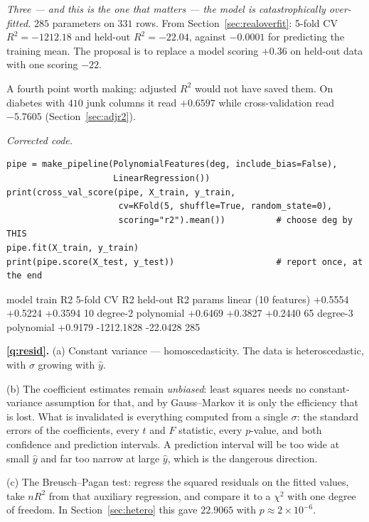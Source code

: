 \documentclass[11pt]{article}
\begin{document}
\emph{Three --- and this is the one that matters --- the model is
catastrophically over-fitted.} $285$ parameters on $331$ rows. From
Section~\ref{sec:realoverfit}: 5-fold CV $R^2 = -1212.18$ and held-out
$R^2 = -22.04$, against $-0.0001$ for predicting the training mean. The
proposal is to replace a model scoring $+0.36$ on held-out data with one
scoring $-22$.

A fourth point worth making: adjusted $R^2$ would not have saved them. On
diabetes with $410$ junk columns it read $+0.6597$ while cross-validation read
$-5.7605$ (Section~\ref{sec:adjr2}).

\emph{Corrected code.}
\begin{lstlisting}
pipe = make_pipeline(PolynomialFeatures(deg, include_bias=False),
                     LinearRegression())
print(cross_val_score(pipe, X_train, y_train,
                      cv=KFold(5, shuffle=True, random_state=0),
                      scoring="r2").mean())          # choose deg by THIS
pipe.fit(X_train, y_train)
print(pipe.score(X_test, y_test))                    # report once, at the end
\end{lstlisting}
\begin{codeout}
model                          train R2    5-fold CV R2   held-out R2   params
linear (10 features)         +0.5554        +0.5224        +0.3594          10
degree-2 polynomial          +0.6469        +0.3827        +0.2440          65
degree-3 polynomial          +0.9179     -1212.1828       -22.0428         285
\end{codeout}

\medskip
\textbf{\ref{q:resid}.} (a) Constant variance --- homoscedasticity. The data is
heteroscedastic, with $\sigma$ growing with $\hat y$.

(b) The coefficient estimates remain \emph{unbiased}: least squares needs no
constant-variance assumption for that, and by Gauss--Markov it is only the
efficiency that is lost. What is invalidated is everything computed from a
single $\sigma$: the standard errors of the coefficients, every $t$ and $F$
statistic, every $p$-value, and both confidence and prediction intervals. A
prediction interval will be too wide at small $\hat y$ and far too narrow at
large $\hat y$, which is the dangerous direction.

(c) The Breusch--Pagan test: regress the squared residuals on the fitted
values, take $nR^2$ from that auxiliary regression, and compare it to a
$\chi^2$ with one degree of freedom. In Section~\ref{sec:hetero} this gave
$22.9065$ with $p \approx 2\times10^{-6}$.
\end{document}

